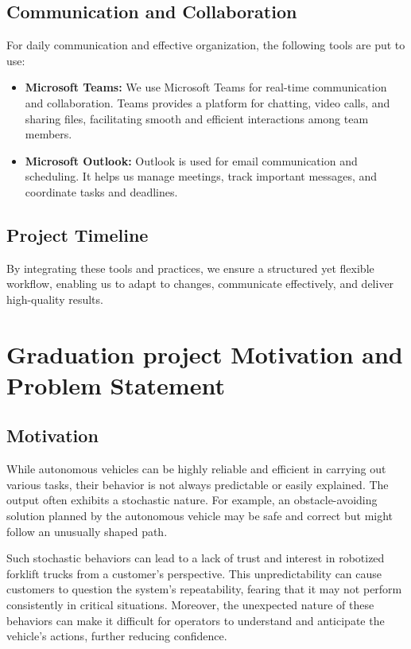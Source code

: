 \subsection{Communication and Collaboration}
For daily communication and effective organization, the following tools are put to use:
\begin{itemize}
\item  \textbf{Microsoft Teams: }We use Microsoft Teams for real-time communication and collaboration. 
Teams provides a platform for chatting, video calls, and sharing files, facilitating smooth and efficient 
interactions among team members.

\item  \textbf{Microsoft Outlook: }Outlook is used for email communication and scheduling. It helps us 
manage meetings, track important messages, and coordinate tasks and deadlines.
\end{itemize}

\subsection{Project Timeline}

By integrating these tools and practices, we ensure a structured yet flexible workflow, enabling us to adapt 
to changes, communicate effectively, and deliver high-quality results.


\section{Graduation project Motivation and Problem Statement}

\subsection{Motivation}


While autonomous vehicles can be highly reliable and efficient in carrying out various 
tasks, their behavior is not always predictable or easily explained. The output often 
exhibits a stochastic nature. For example, an obstacle-avoiding solution planned by 
the autonomous vehicle may be safe and correct but might follow an unusually shaped path. 

Such stochastic behaviors can lead to a lack of trust and interest in robotized forklift 
trucks from a customer’s perspective. This unpredictability can cause customers to 
question the system's repeatability, fearing that it may not perform consistently in 
critical situations. Moreover, the unexpected nature of these behaviors can make it 
difficult for operators to understand and anticipate the vehicle's actions, further 
reducing confidence. 

